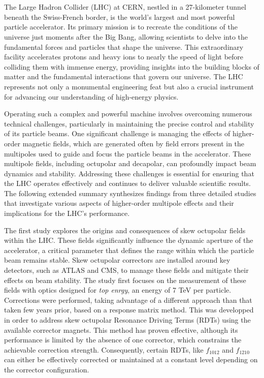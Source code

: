 \chapter{}

{
\fontsize{12pt}{17pt}\selectfont

The Large Hadron Collider (LHC) at CERN, nestled in a 27-kilometer tunnel beneath the
Swiss-French border, is the world's largest and most powerful particle accelerator. Its primary
mission is to recreate the conditions of the universe just moments after the Big Bang, allowing
scientists to delve into the fundamental forces and particles that shape the universe. This
extraordinary facility accelerates protons and heavy ions to nearly the speed of light before
colliding them with immense energy, providing insights into the building blocks of matter and the
fundamental interactions that govern our universe. The LHC represents not only a monumental
engineering feat but also a crucial instrument for advancing our understanding of high-energy
physics.

Operating such a complex and powerful machine involves overcoming numerous technical challenges,
particularly in maintaining the precise control and stability of its particle beams. One significant
challenge is managing the effects of higher-order magnetic fields, which are generated often by
field errors present in the multipoles used to guide and focus the particle beams in the
accelerator.  These multipole fields, including octupolar and decapolar, can profoundly impact beam
dynamics and stability. Addressing these challenges is essential for ensuring that the LHC operates
effectively and continues to deliver valuable scientific results. The following extended summary
synthesizes findings from three detailed studies that investigate various aspects of higher-order
multipole effects and their implications for the LHC's performance.


The first study explores the origins and consequences of skew octupolar fields within the LHC. 
These fields significantly influence the dynamic aperture of the accelerator, a critical parameter
that defines the range within which the particle beam remains stable. 
Skew octupolar correctors are installed around key detectors, such as ATLAS and CMS, to manage these
fields and mitigate their effects on beam stability. 
The study first focuses on the measurement of these fields with optics designed for \textit{top
enrgy}, an energy of 7 TeV per particle. Corrections were performed, taking advantage of a different
approach than that taken few years prior, based on a response matrix method. This was developped in
order to address skew octupolar Resonance Driving Terms (RDTs) using the available corrector
magnets.
This method has proven effective, although its performance is limited by the absence of one
corrector, which constrains the achievable correction strength. Consequently, certain RDTs, like
$f_{1012}$ and $f_{1210}$ can either be effectively corrected or maintained at a constant level
depending on the corrector configuration. 

}
